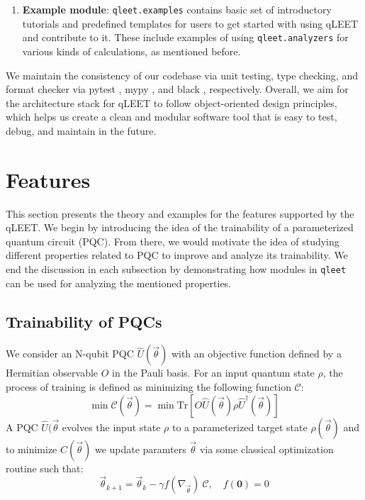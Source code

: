 \begin{enumerate}
	\item \textbf{Example module}: \texttt{qleet.examples} contains basic set of introductory tutorials and predefined templates for users to get started with using qLEET and contribute to it. These include examples of using \texttt{qleet.analyzers} for various kinds of calculations, as mentioned before.

\end{enumerate} 

We maintain the consistency of our codebase via unit testing, type checking, and format checker via pytest \cite{pytestx.y}, mypy \cite{mypy}, and black \cite{black}, respectively. Overall, we aim for the architecture stack for qLEET to follow object-oriented design principles, which helps us create a clean and modular software tool that is easy to test, debug, and maintain in the future. 



\section{\label{sec:features}Features}

This section presents the theory and examples for the features supported by the qLEET. We begin by introducing the idea of the trainability of a parameterized quantum circuit (PQC). From there, we would motivate the idea of studying different properties related to PQC to improve and analyze its trainability. We end the discussion in each subsection by demonstrating how modules in \texttt{qleet} can be used for analyzing the mentioned properties. 

\subsection{\label{sec:training}Trainability of PQCs}

We consider an N-qubit PQC $\hat{U}(\vec{\theta})$ with an objective function defined by a Hermitian observable $O$ in the Pauli basis. For an input quantum state $\rho$, the process of training is defined as minimizing the following function $\mathcal{C}$:
\begin{equation}
	\min \mathcal{C}(\vec{\theta}) = \min \text{Tr}[O \hat{U}(\vec{\theta}) \rho \hat{U}^{\dagger}(\vec{\theta})]
\end{equation}
A PQC $\hat{U}(\vec{\theta}$ evolves the input state $\rho$ to a parameterized target state $\rho(\vec{\theta})$ and to minimize $C(\vec{\theta})$ we update paramters $\vec{\theta}$ via some classical optimization routine such that:
\begin{equation}
	\vec{\theta}_{k+1} = \vec{\theta}_k - \gamma f(\nabla_{\vec{\theta}})\ \mathcal{C}, \quad f(\textbf{0})= 0 
\end{equation}

